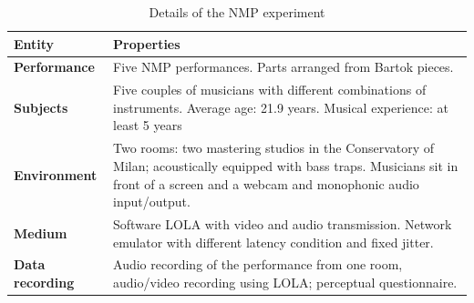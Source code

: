 \begin{table}[b]
	\centering
	\caption{Details of the NMP experiment}
	\begin{tabular}{p{1.5cm}p{6cm}}
		\hline
		\textbf{Entity} & \textbf{Properties} \\
		\hline
		\textbf{Performance} & Five NMP performances. \newline  Parts arranged from Bartok pieces. \\
		\textbf{Subjects} & Five couples of musicians with different combinations of instruments. Average age: 21.9 years. Musical experience: at least 5 years\\
		\textbf{Environment} & Two rooms: two mastering studios in the Conservatory of Milan; acoustically equipped with bass traps. Musicians sit in front of a screen and a webcam and monophonic audio input/output.\\
		\textbf{Medium} & Software LOLA with video and audio transmission. Network emulator with different latency condition and fixed jitter. \\
		\textbf{Data} \newline \textbf{recording} & Audio recording of the performance from one room, audio/video recording using LOLA; perceptual questionnaire.\\
		\hline
	\end{tabular}
	\label{tab:exp2}
\end{table}



